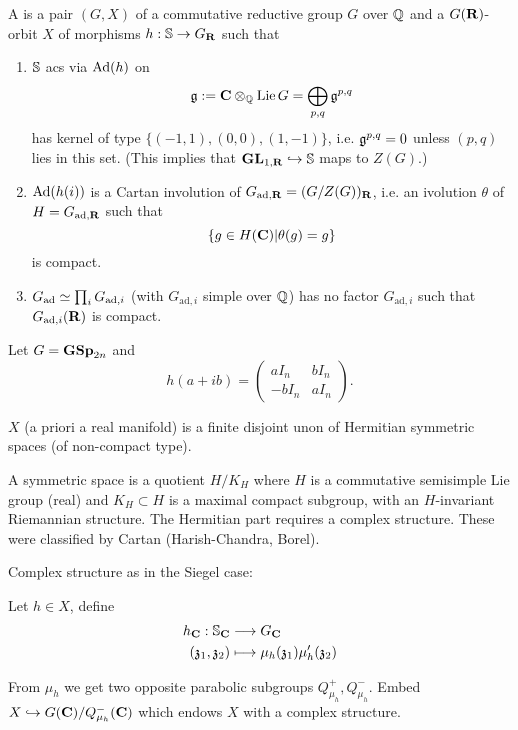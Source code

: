 \begin{definition}
	A  is a pair $(G,X)$ of a commutative reductive group $G$ over $\Q$ and a $G(\R)$-orbit $X$ of morphisms $h:\S\to G_{\R}$ such that
	\begin{enumerate}[1)]
		\item $\S$ acs via $\Ad(h)$ on
			\[
				\kg \defeq \C\otimes_\Q \Lie G = \bigoplus_{p,q}\kg^{p,q}
			\] 
			has kernel of type $\{(-1,1), (0,0), (1,-1)\} $, i.e. $\kg^{p,q}=0$ unless $(p,q)$ lies in this set. (This implies that $\GL_{1,\R}\injto \S$ maps to $Z(G)$.)
		\item $\Ad(h(i))$ is a Cartan involution of $G_{\text{ad},\R} = (G /Z(G))_{\R}$, i.e. an ivolution $\theta$ of $H = G_{\text{ad},\R}$ such that
			\[
				\{g\in H(\C) | \theta(g)=g\} 
			\] 
			is compact.
		\item $G_{\text{ad}}\isoto\prod_i G_{\text{ad},i}$ (with $G_{\text{ad},i}$ simple over $\Q$) has no factor $G_{\text{ad},i}$ such that $G_{\text{ad},i}(\R)$ is compact.
	\end{enumerate}
\end{definition}
\begin{example}
	Let $G=\GSp_{2n}$ and
	\[
		h(a+ib) = \begin{pmatrix} aI_n & bI_n \\ -bI_n & aI_n \end{pmatrix} .
	\] 
\end{example}
\begin{proposition}
	$X$ (a priori a real manifold) is a finite disjoint unon of Hermitian symmetric spaces (of non-compact type).
\end{proposition}
A symmetric space is a quotient $H /K_H$ where $H$ is a commutative semisimple Lie group (real) and $K_H\subset H$ is a maximal compact subgroup, with an $H$-invariant Riemannian structure. The Hermitian part requires a complex structure. These were classified by Cartan (Harish-Chandra, Borel).

Complex structure as in the Siegel case:
\begin{definition}
	Let $h\in X$, define
	\begin{align*}
		h_{\C}: \S_{\C} &\longrightarrow G_{\C} \\
		(\kz_1,\kz_2) &\longmapsto \mu_h(\kz_1)\mu_h'(\kz_2)
	\end{align*}
\end{definition}
From $\mu_h$ we get two opposite parabolic subgroups $Q_{\mu_h}^{+},Q_{\mu_h}^{-}$. Embed $X\injto G(\C) / Q_{\mu_h}^{-}(\C)$ which endows $X$ with a complex structure. 

